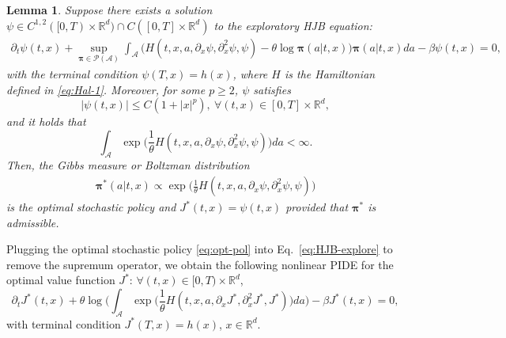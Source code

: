 \documentclass[11pt]{article}
\newtheorem{lemma}{Lemma}
\newcommand{\1}{\mathbbm{1}}
\newcommand{\bpi}{\boldsymbol{\pi}}
\begin{document}
\begin{lemma} \label{lem:expHJB}
Suppose there exists a solution $ \psi \in C^{1,2}([0,T)\times\mathbb{R}^d)\cap C([0,T]\times\mathbb{R}^d)$ to the exploratory HJB equation: %
\begin{align} \label{eq:HJB-explore}
	\partial_t \psi(t,x)   +  \sup_{\bpi\in \mathcal{P} (\mathcal{A})} \int_{\mathcal{A}} \big( H(t,x, a, \partial_x\psi,  \partial_x^2\psi, \psi) - \theta \log \boldsymbol{\pi}(a|t,x)\big) \boldsymbol{\pi}(a|t,x) da  - \beta \psi (t, x) = 0,
\end{align}
with the terminal condition $\psi(T, x)  = h (x)$,  where $H$ is the Hamiltonian defined in \eqref{eq:Hal-1}. Moreover, for some $p\geq 2$, $\psi$ satisfies
\begin{equation}
	|\psi(t, x)|\leq C(1+|x|^p),\ \forall (t,x)\in[0,T]\times\mathbb{R}^d,\label{eq:OVF-PolyG}
\end{equation}
and it holds that
\begin{equation}
	\int_{\mathcal{A}} \exp \Big(\frac{1}{\theta} H(t,x, a, \partial_x\psi,  \partial_x^2\psi, \psi)\Big) da<\infty.
\end{equation}
Then, the Gibbs measure or Boltzman distribution
\begin{align}\label{eq:opt-pol}
	{\bpi}^*(a| t, x) \propto \exp \Big(\frac{1}{\theta} H(t,x, a, \partial_x\psi,  \partial_x^2\psi, \psi)\Big)
\end{align}
 is the optimal stochastic policy and $J^*(t,x)=\psi(t,x)$ provided that $\boldsymbol{\pi}^*$ is admissible.
\end{lemma}

Plugging the optimal stochastic policy \eqref{eq:opt-pol} into Eq.~\eqref{eq:HJB-explore} to remove the supremum operator, we obtain the following nonlinear PIDE for the optimal value function $J^*$: $\forall (t,x) \in [0, T)\times\mathbb{R}^d$,
\begin{equation} \label{eq:HJB-explore2}
\partial_t J^*(t,x)   + \theta \log \bigg(\int_{\mathcal{A}} \exp \Big(\frac{1}{\theta} H(t,x, a, \partial_xJ^*,  \partial_x^2J^*, J^*)\Big)  da \bigg)  - \beta J^* (t, x) = 0,
\end{equation}
with terminal condition $J^*(T,x)=h(x)$, $x\in\mathbb{R}^d$.
\end{document}
